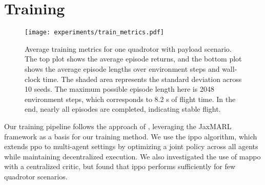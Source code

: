 

\section{Training}
\begin{figure}[ht]
    \centering
    
    \texttt{[image: experiments/train\_metrics.pdf]}
    \caption[Training Metrics]{Average training metrics for one quadrotor with payload scenario. The top plot shows the average episode returns, and the bottom plot shows the average episode lengths over environment steps and wall-clock time. The shaded area represents the standard deviation across 10 seeds. The maximum possible episode length here is 2048 environment steps, which corresponds to 8.2 s of flight time. In the end, nearly all episodes are completed, indicating stable flight.}
    \label{fig:train_metrics}
\end{figure}
Our training pipeline follows the approach of \autocite{flair2023jaxmarl}, leveraging the JaxMARL framework as a basis for our training method. We use the \gls{ippo} algorithm, which extends \gls{ppo} to multi-agent settings by optimizing a joint policy across all agents while maintaining decentralized execution. We also investigated the use of \gls{mappo} with a centralized critic, but found that \gls{ippo} performs sufficiently for few quadrotor scenarios.

